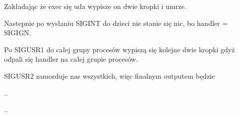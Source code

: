 Zakładając że exec się uda wypisze on dwie kropki i umrze.

Nastepnie po wysłaniu SIGINT do dzieci nie stanie się nic, bo handler = SIGIGN.

Po SIGUSR1 do całej grupy procesów wypiszą się kolejne dwie kropki gdyż odpali się handler na całej grupie procesów.

SIGUSR2 zamorduje nas wszystkich, więc finalnym outputem będzie 

..

..
